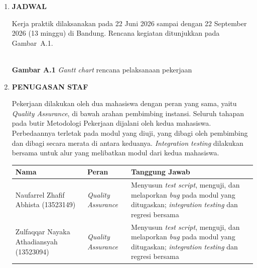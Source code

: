 \begin{framed}
\begin{enumerate}[label=\arabic*.,leftmargin=1.2cm,itemsep=6pt]
\item \textbf{JADWAL}

Kerja praktik dilaksanakan pada 22 Juni 2026 sampai dengan 22 September 2026 (13 minggu) di Bandung. Rencana kegiatan ditunjukkan pada Gambar~A.1.

\begin{center}
\\[4pt]\textbf{Gambar A.1} \textit{Gantt chart} rencana pelaksanaan pekerjaan
\end{center}

\item \textbf{PENUGASAN STAF}

Pekerjaan dilakukan oleh dua mahasiswa dengan peran yang sama, yaitu \textit{Quality Assurance}, di bawah arahan pembimbing instansi. Seluruh tahapan pada butir Metodologi Pekerjaan dijalani oleh kedua mahasiswa. Perbedaannya terletak pada modul yang diuji, yang dibagi oleh pembimbing dan dibagi secara merata di antara keduanya. \textit{Integration testing} dilakukan bersama untuk alur yang melibatkan modul dari kedua mahasiswa.

\begin{center}
\small
\begin{tabularx}{\linewidth}{|p{3.6cm}|p{2.6cm}|X|}
\hline
\textbf{Nama} & \textbf{Peran} & \textbf{Tanggung Jawab} \\
\hline
Naufarrel Zhafif Abhista (13523149) & \textit{Quality Assurance} & Menyusun \textit{test script}, menguji, dan melaporkan \textit{bug} pada modul yang ditugaskan; \textit{integration testing} dan regresi bersama \\
\hline
Zulfaqqar Nayaka Athadiansyah (13523094) & \textit{Quality Assurance} & Menyusun \textit{test script}, menguji, dan melaporkan \textit{bug} pada modul yang ditugaskan; \textit{integration testing} dan regresi bersama \\
\hline
\end{tabularx}
\end{center}


\end{enumerate}
\end{framed}
